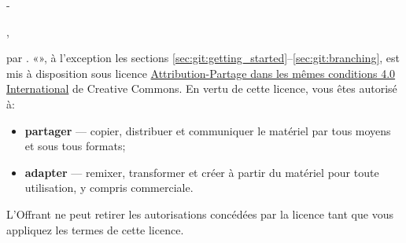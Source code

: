 
\begingroup
\calccentering{\unitlength}
\begin{adjustwidth*}{\unitlength}{-\unitlength}
  \setlength{\parindent}{0pt}
  \setlength{\parskip}{\baselineskip}
  \small

  {\theauthor}, {\year}

  {\textcopyright} {\year} par {\theauthor}. «\thetitle», à
  l'exception les sections
  \ref*{sec:git:getting_started}--\ref*{sec:git:branching}, est mis à
  disposition sous licence
  \href{https://creativecommons.org/licenses/by-sa/4.0/deed.fr}{%
    Attribution-Partage dans les mêmes conditions 4.0 International}
  de Creative Commons. En vertu de cette licence, vous êtes autorisé
  à:
  \begin{itemize}
  \item \textbf{partager} --- copier, distribuer et communiquer le
    matériel par tous moyens et sous tous formats;
  \item \textbf{adapter} --- remixer, transformer et créer à partir du
    matériel pour toute utilisation, y compris commerciale.
  \end{itemize}
  L'Offrant ne peut retirer les autorisations concédées par la licence
  tant que vous appliquez les termes de cette licence.


\end{adjustwidth*}
